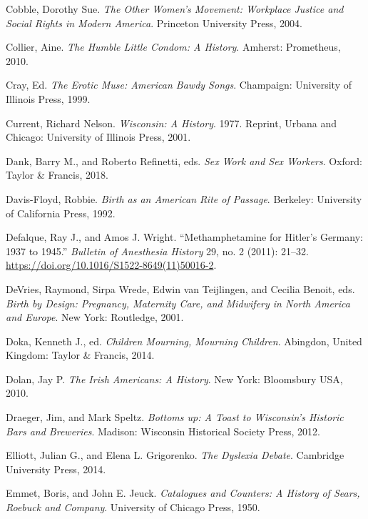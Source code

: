 \documentclass[
  american,
  letterpaper,
]{book}
\newlength{\cslhangindent}
\newenvironment{CSLReferences}[2] %
 {\begin{list}{}{%
  \setlength{\itemindent}{0pt}
  \setlength{\leftmargin}{0pt}
  \setlength{\parsep}{0pt}
  \ifodd #1
   \setlength{\leftmargin}{\cslhangindent}
   \setlength{\itemindent}{-1\cslhangindent}
  \fi
  \setlength{\itemsep}{#2\baselineskip}}}
 {\end{list}}
\begin{document}
\begin{CSLReferences}{1}{0}
Cobble, Dorothy Sue. \emph{The Other Women's Movement: Workplace Justice
and Social Rights in Modern America}. Princeton University Press, 2004.

Collier, Aine. \emph{The Humble Little Condom: A History}. Amherst:
Prometheus, 2010.

Cray, Ed. \emph{The Erotic Muse: American Bawdy Songs}. Champaign:
University of Illinois Press, 1999.

Current, Richard Nelson. \emph{Wisconsin: A History}. 1977. Reprint,
{Urbana and Chicago}: University of Illinois Press, 2001.

Dank, Barry M., and Roberto Refinetti, eds. \emph{Sex Work and Sex
Workers}. Oxford: Taylor \& Francis, 2018.

Davis-Floyd, Robbie. \emph{Birth as an American Rite of Passage}.
Berkeley: University of California Press, 1992.

Defalque, Ray J., and Amos J. Wright. {``Methamphetamine for Hitler's
Germany: 1937 to 1945.''} \emph{Bulletin of Anesthesia History} 29, no.
2 (2011): 21--32. \url{https://doi.org/10.1016/S1522-8649(11)50016-2}.

DeVries, Raymond, Sirpa Wrede, Edwin van Teijlingen, and Cecilia Benoit,
eds. \emph{Birth by Design: Pregnancy, Maternity Care, and Midwifery in
North America and Europe}. New York: Routledge, 2001.

Doka, Kenneth J., ed. \emph{Children Mourning, Mourning Children}.
Abingdon, United Kingdom: Taylor \& Francis, 2014.

Dolan, Jay P. \emph{The Irish Americans: A History}. New York:
Bloomsbury USA, 2010.

Draeger, Jim, and Mark Speltz. \emph{Bottoms up: A Toast to Wisconsin's
Historic Bars and Breweries}. Madison: Wisconsin Historical Society
Press, 2012.

Elliott, Julian G., and Elena L. Grigorenko. \emph{The Dyslexia Debate}.
Cambridge University Press, 2014.

Emmet, Boris, and John E. Jeuck. \emph{Catalogues and Counters: A
History of Sears, Roebuck and Company}. University of Chicago Press,
1950.


\end{CSLReferences}
\end{document}

